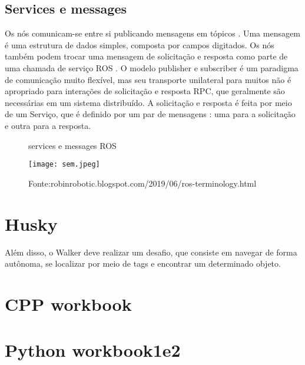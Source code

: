 \subsection{Services e messages}
Os nós comunicam-se entre si publicando mensagens em tópicos . Uma mensagem é uma estrutura de dados simples, composta por campos digitados.
Os nós também podem trocar uma mensagem de solicitação e resposta como parte de uma chamada de serviço ROS .
O modelo publisher e subscriber é um paradigma de comunicação muito flexível, mas seu transporte unilateral para muitos não é apropriado
para interações de solicitação e resposta RPC, que geralmente são necessárias em um sistema distribuído. 
A solicitação e resposta é feita por meio de um Serviço, que é definido por um par de mensagens : uma para a solicitação e outra para a resposta.
\begin{figure} [h!]	
   \centering
   \caption{services e messages ROS}
   \texttt{[image: sem.jpeg]}
   \caption*{Fonte:robinrobotic.blogspot.com/2019/06/ros-terminology.html}
   \label{fig:servicesemessages}
\end{figure}	
 \section{Husky}
 Além disso, o Walker deve realizar um desafio, que consiste em navegar de forma autônoma, se localizar por meio de tags e encontrar um determinado objeto.
 \section{CPP workbook}
 \section{Python workbook1e2}




